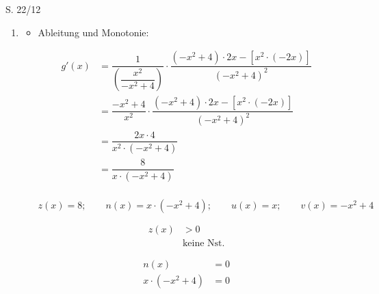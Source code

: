\begin{Exercise}{S. 22/12}{}
    \begin{enumerate}
        \item [12.]\begin{itemize}[leftmargin=*]
            $g(x) = \ln\left(\dfrac{x^{2}}{-x^{2} +4}\right);  \qquad D_{g} = \left] \ 0; 2 \ \right[; \qquad P(0/\sqrt{2}) \in g^{-1}$\\
            \item Ableitung und Monotonie: \\{
                \vspace{-2.0ex}
                \begin{align*}
                    g'(x) &= \dfrac{1}{\left(\dfrac{x^{2}}{-x^{2} +4}\right)} \cdot \dfrac{\left(-x^{2} +4\right) \cdot 2x - \left[x^{2} \cdot \left(-2x\right)\right]}{\left(-x^{2} +4\right)^{2}} &&\\[1.5ex]
                    &= \dfrac{-x^{2} +4}{x^{2}} \cdot \dfrac{\left(-x^{2} +4\right) \cdot 2x - \left[x^{2} \cdot \left(-2x\right)\right]}{\left(-x^{2} +4\right)^{2}} &&\\[1.5ex]
                    &= \dfrac{2x \cdot 4}{x^{2} \cdot \left(-x^{2} +4\right)} &&\\[1.5ex]
                    &= \dfrac{8}{x \cdot \left(-x^{2} +4\right)}
                \end{align*}\\[-1.0ex]
                $z(x) = 8; \qquad n(x) = x \cdot \left(-x^{2} +4\right); \qquad u(x) = x; \qquad v(x) = -x^{2} +4$\\[-1.0ex]
                \begin{minipage}[t]{0.20\linewidth}
                    \begin{align*}
                        z(x) &> 0 &&\\[2.0ex]
                        & \text{keine Nst.} &&
                    \end{align*}
                \end{minipage}
                \hfill
                \begin{minipage}[t]{0.70\linewidth}
                    \begin{align*}
                        n(x) &= 0 && \\[2.0ex]
                        x \cdot \left(-x^{2} +4\right) &= 0 &&
                    \end{align*}
                    \vspace{-2.0ex}
                    \begin{minipage}[t]{0.30\linewidth}

\end{minipage}
\end{minipage}}
\end{itemize}
\end{enumerate}
\end{Exercise}
